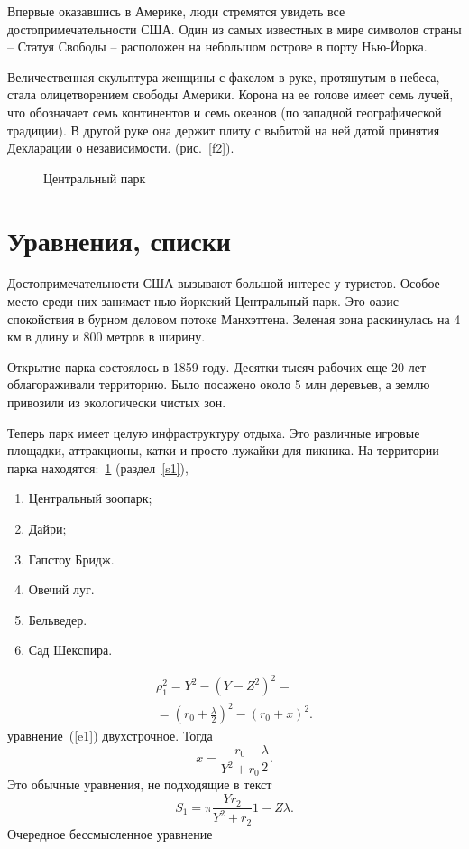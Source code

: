 \documentclass[a4paper,12pt]{article}
\begin{document}
Впервые оказавшись в Америке, люди стремятся увидеть все достопримечательности США. Один из самых известных в мире символов страны – Статуя Свободы – расположен на небольшом острове в порту Нью-Йорка.

Величественная скульптура женщины с факелом в руке, протянутым в небеса, стала олицетворением свободы Америки. Корона на ее голове имеет семь лучей, что обозначает семь континентов и семь океанов (по западной географической традиции). В другой руке она держит плиту с выбитой на ней датой принятия Декларации о независимости. (рис.~\ref{f2}).
		\cite{SHTAB}
	\begin{figure}[t] 
		\caption{Центральный парк}
		\label{f3}
	\end{figure}
	\newpage
	\section{Уравнения, списки} 
	\label{s2}
	Достопримечательности США вызывают большой интерес у туристов. Особое место среди них занимает нью-йоркский Центральный парк. Это оазис спокойствия в бурном деловом потоке Манхэттена. Зеленая зона раскинулась на 4 км в длину и 800 метров в ширину.
	
	Открытие парка состоялось в 1859 году. Десятки тысяч рабочих еще 20 лет облагораживали территорию. Было посажено около 5 млн деревьев, а землю привозили из экологически чистых зон.
	
	Теперь парк имеет целую инфраструктуру отдыха. Это различные игровые площадки, аттракционы, катки и просто лужайки для пикника. На территории парка находятся:~\ref{f3} (раздел~\ref{s1}),
		\begin{enumerate} 
		\item Центральный зоопарк;
		\item Дайри;
		\item Гапстоу Бридж.
		\item Овечий луг.
		\item Бельведер.
		\item Сад Шекспира.
	\end{enumerate}
	\begin{eqnarray}
		\label{e1}
		\rho^2_1 = Y^2 - (Y - Z^2)^2 = \nonumber \\
		= (r_0 + \frac{\lambda}{2})^2 - (r_0 + x)^2.
	\end{eqnarray}
	уравнение~(\ref{e1}) двухстрочное. Тогда
	\begin{equation}
		\label{e2}
		x = \frac{r_0}{Y^2 + r_0}\frac{\lambda}{2}.
	\end{equation}
	Это обычные уравнения, не подходящие в текст
	\begin{equation}
		\label{e3}
		S_1 = \pi\frac{Yr_2}{Y^2 + r_2}{1-Z}\lambda.
	\end{equation}
Очередное бессмысленное уравнение
	\cite{Smik}
	\newpage
\end{document}
